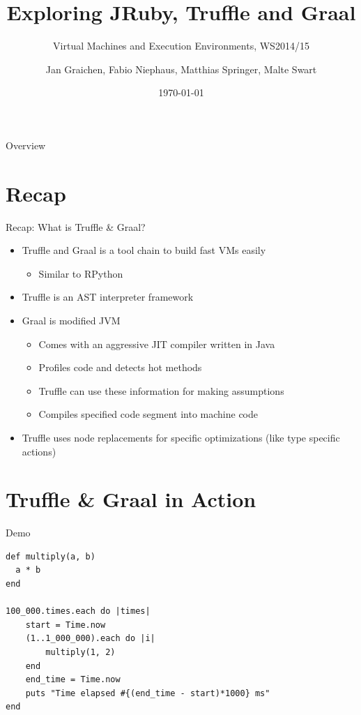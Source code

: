 \documentclass[xcolor=dvipsname,handout]{beamer} %
\title{Exploring JRuby, Truffle and Graal}
\subtitle{Virtual Machines and Execution Environments, WS2014/15}
\author{Jan Graichen, Fabio Niephaus, Matthias Springer, Malte Swart}
\date{\today}
\institute[2012]{Hasso Plattner Institute, Software Architecture Group}
\begin{document}
\begin{frame}[plain]
	\maketitle
\end{frame}
\begin{frame}{Overview}
	\tableofcontents[hideallsubsections]
\end{frame}


\section{Recap}

\begin{frame}{Recap: What is Truffle \& Graal?}
\begin{itemize}
    \item Truffle and Graal is a tool chain to build fast VMs easily
    \begin{itemize}
      \item Similar to RPython
    \end{itemize}
    \item Truffle is an AST interpreter framework
    \item Graal is modified JVM
    \begin{itemize}
      \item Comes with an aggressive JIT compiler written in Java
      \item Profiles code and detects hot methods
      \item Truffle can use these information for making assumptions
      \item Compiles specified code segment into machine code
    \end{itemize}
    \item Truffle uses node replacements for specific optimizations (like type specific actions)
\end{itemize}
\end{frame}


\section{Truffle \& Graal in Action}

\begin{frame}[fragile]{Demo}
\begin{center}

\begin{lstlisting}
def multiply(a, b)
  a * b
end

100_000.times.each do |times|
    start = Time.now
    (1..1_000_000).each do |i|
        multiply(1, 2)
    end
    end_time = Time.now
    puts "Time elapsed #{(end_time - start)*1000} ms"
end
\end{lstlisting}
\end{center}
\end{frame}
\end{document}
